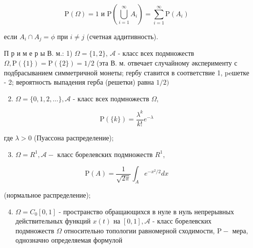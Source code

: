 \documentclass[10pt]{article}
\begin{document}
\[

\mathrm{P}(\Omega)=1 \text { и } \mathrm{P}\left(\bigcup_{i=1}^{\infty} A_{i}\right)=\sum_{i=1}^{\infty} \mathrm{P}\left(A_{i}\right)

\]



если $A_{i} \cap A_{j}=\phi$ при $i \neq j$ (счетная аддитивность).



П р и м е р ы В. м.: 1) $\Omega=\{1,2\}$, $\mathcal{A}$ - класс всех подмножеств $\Omega, \mathrm{P}(\{1\})=\mathrm{P}(\{2\})=1 / 2$ (эта В. м. отвечает случайному әксперименту с подбрасыванием симметричной монеты; гербу ставится в соответствие 1, peшетке - 2; вероятность выпадения герба (решетки) равна $1 / 2)$



\begin{enumerate}

  \setcounter{enumi}{1}

  \item $\Omega=\{0,1,2, \ldots\}, \mathcal{A}$ - класс всех подмножеств $\Omega$,

\end{enumerate}



\[

\mathrm{P}(\{k\})=\frac{\lambda^{k}}{k !} e^{-\lambda}

\]



где $\lambda>0$ (Пуассона распределение);



\begin{enumerate}

  \setcounter{enumi}{2}

  \item $\Omega=R^{1}, \mathscr{A}-$ класс борелевских подмножеств $R^{1}$,

\end{enumerate}



\[

\mathrm{P}(A)=\frac{1}{\sqrt{2 \pi}} \int_{A} e^{-x^{2} / 2} d x

\]



(нормальное распределение);



\begin{enumerate}

  \setcounter{enumi}{3}

  \item $\Omega=C_{0}[0,1]$ - пространство обращающихся в нуле в нуль непрерывных действительных функций $x(t)$ на $[0,1], \mathcal{A}$ - класс борелевских подмножеств $\Omega$ относительно топологии равномерной сходимости, $\mathrm{P}-$ мера, однозначно определяемая формулой

\end{enumerate}
\end{document}
